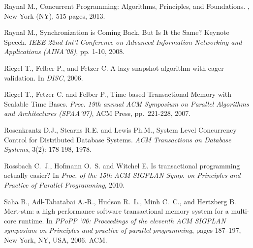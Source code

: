 \begin{thebibliography}{99}
{%


Raynal  M.,
\newblock Concurrent Programming: Algorithms, Principles, and Foundations.
, New York (NY), 515 pages, 2013.

Raynal  M.,
Synchronization is Coming Back, But Is It the Same?
Keynote Speech. {\it  IEEE 22nd Int'l Conference on Advanced 
Information  Networking and Applications (AINA'08)},  pp. 1-10, 2008. 




Riegel T., Felber P., and Fetzer C.
\newblock A lazy snapshot algorithm with eager validation.
\newblock In {\em DISC}, 2006.


Riegel T., Fetzer C. and Felber P.,
Time-based Transactional Memory with Scalable Time Bases.
{\em  Proc.   19th  annual  ACM   Symposium  on  Parallel   Algorithms  and
Architectures (SPAA'07)}, ACM Press, pp.~221-228, 2007.



Rosenkrantz D.J.,  Stearns R.E. and Lewis Ph.M., 
System Level Concurrency Control for Distributed Database Systems.
{\it  ACM Transactions on  Database Systems},  3(2): 178-198, 1978.



Rossbach C.~J., Hofmann O.~S. and Witchel E.
\newblock Is transactional programming actually easier?
\newblock In {\em Proc. of the 15th ACM SIGPLAN Symp. on Principles and
  Practice of Parallel Programming}, 2010.


Saha B., Adl-Tabatabai A.-R., Hudson R.~L., Minh C.~C., and
  Hertzberg B.
\newblock Mcrt-stm: a high performance software transactional memory system for
  a multi-core runtime.
\newblock In {\em PPoPP '06: Proceedings of the eleventh ACM SIGPLAN symposium
  on Principles and practice of parallel programming}, pages 187--197, New
  York, NY, USA, 2006. ACM.




}
\end{thebibliography}
